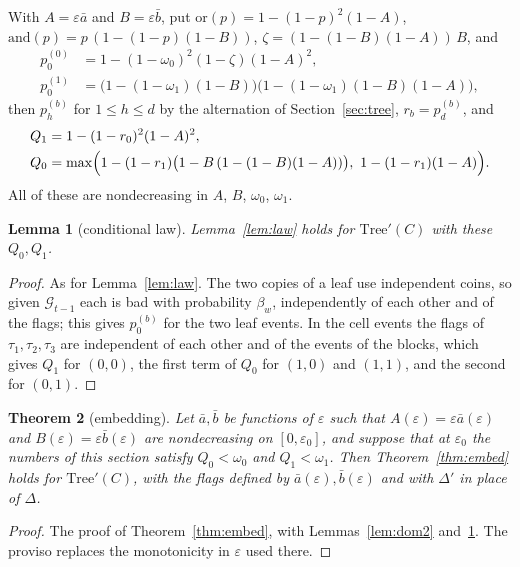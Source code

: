 \documentclass[11pt]{amsart}
\newtheorem{theorem}{Theorem}
\newtheorem{lemma}[theorem]{Lemma}
\theoremstyle{definition}
\theoremstyle{remark}
\newcommand{\eps}{\varepsilon}
\begin{document}
With $A=\eps\bar a$ and $B=\eps\bar b$, put $\mathrm{or}(p)=1-(1-p)^2(1-A)$,
$\mathrm{and}(p)=p\,(1-(1-p)(1-B))$, $\zeta=(1-(1-B)(1-A))\,B$, and
\begin{align*}
p^{(0)}_0&=1-(1-\omega_0)^2(1-\zeta)(1-A)^2,\\
p^{(1)}_0&=\bigl(1-(1-\omega_1)(1-B)\bigr)\bigl(1-(1-\omega_1)(1-B)(1-A)\bigr),
\end{align*}
then $p^{(b)}_h$ for $1\le h\le d$ by the alternation of Section~\ref{sec:tree}, $r_b=p^{(b)}_d$, and
\begin{align*}
Q_1&=1-(1-r_0)^2(1-A)^2,\\
Q_0&=\max\Bigl(1-(1-r_1)\bigl(1-B\,(1-(1-B)(1-A))\bigr),\ 1-(1-r_1)(1-A)\Bigr).
\end{align*}
All of these are nondecreasing in $A$, $B$, $\omega_0$, $\omega_1$.

\begin{lemma}[conditional law]\label{lem:law2}
Lemma~\ref{lem:law} holds for $\mathrm{Tree}'(C)$ with these $Q_0,Q_1$.
\end{lemma}

\begin{proof}
As for Lemma~\ref{lem:law}. The two copies of a leaf use independent coins, so given
$\mathcal G_{t-1}$ each is bad with probability $\beta_w$, independently of each other and of the
flags; this gives $p^{(b)}_0$ for the two leaf events. In the cell events the flags of
$\tau_1,\tau_2,\tau_3$ are independent of each other and of the events of the blocks, which gives
$Q_1$ for $(0,0)$, the first term of $Q_0$ for $(1,0)$ and $(1,1)$, and the second for $(0,1)$.
\end{proof}

\begin{theorem}[embedding]\label{thm:embed2}
Let $\bar a,\bar b$ be functions of $\eps$ such that $A(\eps)=\eps\bar a(\eps)$ and
$B(\eps)=\eps\bar b(\eps)$ are nondecreasing on $[0,\eps_0]$, and suppose that at $\eps_0$ the
numbers of this section satisfy $Q_0<\omega_0$ and $Q_1<\omega_1$. Then Theorem~\ref{thm:embed}
holds for $\mathrm{Tree}'(C)$, with the flags defined by $\bar a(\eps),\bar b(\eps)$ and with
$\Delta'$ in place of $\Delta$.
\end{theorem}

\begin{proof}
The proof of Theorem~\ref{thm:embed}, with Lemmas~\ref{lem:dom2} and~\ref{lem:law2}. The proviso
replaces the monotonicity in $\eps$ used there.
\end{proof}
\end{document}
